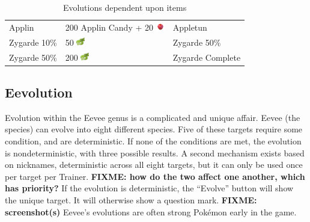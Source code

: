 \begin{table}[ht]
\begin{center}
\begin{tabular}{lll}
    Applin & 200 Applin Candy + 20 \includegraphics[width=1em,height=1em]{images/sweetapple.png} & Appletun \\
    Zygarde 10\% & 50 \includegraphics[width=1em,height=1em]{images/zygardecell.png} & Zygarde 50\% \\
    Zygarde 50\% & 200 \includegraphics[width=1em,height=1em]{images/zygardecell.png} & Zygarde Complete \\
  \end{tabular}
\end{center}
\caption{Evolutions dependent upon items}
\label{table:itemevolutions}
\end{table}

\subsection{Eevolution}
\begin{figure}
\end{figure}
Evolution within the Eevee genus is a complicated and unique affair.
Eevee (the species) can evolve into eight different species.
Five of these targets require some condition, and are deterministic.
If none of the conditions are met, the evolution is nondeterministic,
  with three possible results.
A second mechanism exists based on nicknames, deterministic across all eight targets,
  but it can only be used once per target per Trainer.
\textbf{FIXME: how do the two affect one another, which has priority?}
If the evolution is deterministic, the ``Evolve'' button will show the
  unique target.
It will otherwise show a question mark.
\textbf{FIXME: screenshot(s)}
Eevee's evolutions are often strong Pokémon early in the game.

